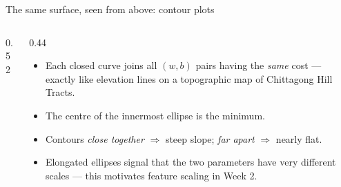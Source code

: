 \documentclass[aspectratio=169,10pt]{beamer}
\begin{document}
\begin{frame}{The same surface, seen from above: contour plots}
  \begin{columns}[T,onlytextwidth]
    \begin{column}{0.52\textwidth}
      \centering
    \end{column}
    \begin{column}{0.44\textwidth}
      \small
      \begin{itemize}
        \item Each closed curve joins all $(w,b)$ pairs having the \emph{same}
              cost --- exactly like elevation lines on a topographic map of
              Chittagong Hill Tracts.
        \item The centre of the innermost ellipse is the minimum.
        \item Contours \emph{close together} $\Rightarrow$ steep slope;
              \emph{far apart} $\Rightarrow$ nearly flat.
        \item Elongated ellipses signal that the two parameters have very
              different scales --- this motivates feature scaling in Week 2.
      \end{itemize}
    \end{column}
  \end{columns}
\end{frame}
\end{document}
